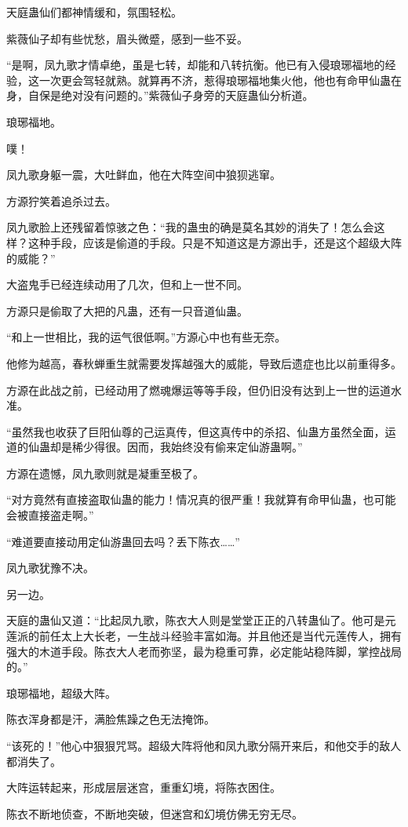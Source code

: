 \begin{this_body}
天庭蛊仙们都神情缓和，氛围轻松。

紫薇仙子却有些忧愁，眉头微蹙，感到一些不妥。

“是啊，凤九歌才情卓绝，虽是七转，却能和八转抗衡。他已有入侵琅琊福地的经验，这一次更会驾轻就熟。就算再不济，惹得琅琊福地集火他，他也有命甲仙蛊在身，自保是绝对没有问题的。”紫薇仙子身旁的天庭蛊仙分析道。

琅琊福地。

噗！

凤九歌身躯一震，大吐鲜血，他在大阵空间中狼狈逃窜。

方源狞笑着追杀过去。

凤九歌脸上还残留着惊骇之色：“我的蛊虫的确是莫名其妙的消失了！怎么会这样？这种手段，应该是偷道的手段。只是不知道这是方源出手，还是这个超级大阵的威能？”

大盗鬼手已经连续动用了几次，但和上一世不同。

方源只是偷取了大把的凡蛊，还有一只音道仙蛊。

“和上一世相比，我的运气很低啊。”方源心中也有些无奈。

他修为越高，春秋蝉重生就需要发挥越强大的威能，导致后遗症也比以前重得多。

方源在此战之前，已经动用了燃魂爆运等等手段，但仍旧没有达到上一世的运道水准。

“虽然我也收获了巨阳仙尊的己运真传，但这真传中的杀招、仙蛊方虽然全面，运道的仙蛊却是稀少得很。因而，我始终没有偷来定仙游蛊啊。”

方源在遗憾，凤九歌则就是凝重至极了。

“对方竟然有直接盗取仙蛊的能力！情况真的很严重！我就算有命甲仙蛊，也可能会被直接盗走啊。”

“难道要直接动用定仙游蛊回去吗？丢下陈衣……”

凤九歌犹豫不决。

另一边。

天庭的蛊仙又道：“比起凤九歌，陈衣大人则是堂堂正正的八转蛊仙了。他可是元莲派的前任太上大长老，一生战斗经验丰富如海。并且他还是当代元莲传人，拥有强大的木道手段。陈衣大人老而弥坚，最为稳重可靠，必定能站稳阵脚，掌控战局的。”

琅琊福地，超级大阵。

陈衣浑身都是汗，满脸焦躁之色无法掩饰。

“该死的！”他心中狠狠咒骂。超级大阵将他和凤九歌分隔开来后，和他交手的敌人都消失了。

大阵运转起来，形成层层迷宫，重重幻境，将陈衣困住。

陈衣不断地侦查，不断地突破，但迷宫和幻境仿佛无穷无尽。


\end{this_body}
